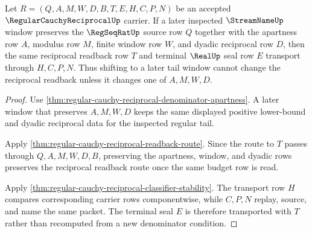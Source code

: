 \begin{theorem}
\label{thm:regular-cauchy-reciprocal-tail-stability}
Let $R=(Q,A,M,W,D,B,T,E,H,C,P,N)$ be an accepted $\RegularCauchyReciprocalUp$ carrier. If a later inspected $\StreamNameUp$ window preserves the $\RegSeqRatUp$ source row $Q$ together with the apartness row $A$, modulus row $M$, finite window row $W$, and dyadic reciprocal row $D$, then the same reciprocal readback row $T$ and terminal $\RealUp$ seal row $E$ transport through $H,C,P,N$. Thus shifting to a later tail window cannot change the reciprocal readback unless it changes one of $A,M,W,D$.
\end{theorem}
\begin{proof}
Use \autoref{thm:regular-cauchy-reciprocal-denominator-apartness}. A later window that preserves $A,M,W,D$ keeps the same displayed positive lower-bound and dyadic reciprocal data for the inspected regular tail.

Apply \autoref{thm:regular-cauchy-reciprocal-readback-route}. Since the route to $T$ passes through $Q,A,M,W,D,B$, preserving the apartness, window, and dyadic rows preserves the reciprocal readback route once the same budget row is read.

Apply \autoref{thm:regular-cauchy-reciprocal-classifier-stability}. The transport row $H$ compares corresponding carrier rows componentwise, while $C,P,N$ replay, source, and name the same packet. The terminal seal $E$ is therefore transported with $T$ rather than recomputed from a new denominator condition.
\end{proof}

